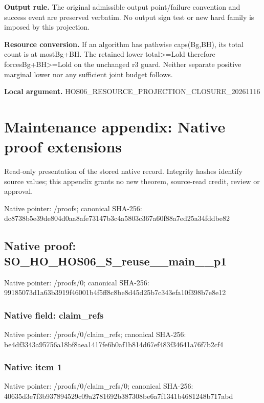 \documentclass[10pt,a4paper]{article}
\begin{document}
\textbf{Output rule.} The original admissible output point/failure convention and success event are preserved verbatim. No output sign test or new hard family is imposed by this projection.

\textbf{Resource conversion.} If an algorithm has pathwise caps(Bg,BH), its total count is at mostBg+BH. The retained lower total>=Lold therefore forcesBg+BH>=Lold on the unchanged r3 guard. Neither separate positive marginal lower nor any sufficient joint budget follows.

\textbf{Local argument.} HOS06\_\allowbreak{}RESOURCE\_\allowbreak{}PROJECTION\_\allowbreak{}CLOSURE\_\allowbreak{}20261116

\section{Maintenance appendix: Native proof extensions}
Read-only presentation of the stored native record. Integrity hashes identify source values; this appendix grants no new theorem, source-read credit, review or approval.

Native pointer: /proofs; canonical SHA-256: dc8738b5e39de804d0aa8afe73147b3c4a5803c367a60f88a7ed25a34fddbe82

\subsection{Native proof: SO\_\allowbreak{}HO\_\allowbreak{}HOS06\_\allowbreak{}S\_\allowbreak{}reuse\_\allowbreak{}\_\allowbreak{}main\_\allowbreak{}\_\allowbreak{}p1}
Native pointer: /proofs/0; canonical SHA-256: 99185073d1a63b3919f46001b4f5ff8c8be8d45d25b7c343efa10f398b7e8e12

\subsubsection{Native field: claim\_\allowbreak{}refs}
Native pointer: /proofs/0/claim\_\allowbreak{}refs; canonical SHA-256: be4df3343a95756a18bf8aea1417fe6b0af1b814d67ef483f34641a76f7b2cf4

\subsubsection{Native item 1}
Native pointer: /proofs/0/claim\_\allowbreak{}refs/0; canonical SHA-256: 40635d3e7f3b937894529c09a2781692b387308be6a7f1341b4681248b717abd
\end{document}
